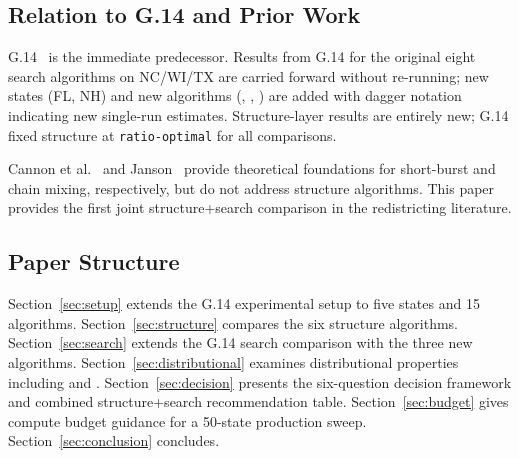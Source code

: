\subsection{Relation to G.14 and Prior Work}

G.14~\citep{dellaLibera2026g14} is the immediate predecessor.
Results from G.14 for the original eight search algorithms on NC/WI/TX are
carried forward without re-running; new states (FL, NH) and new algorithms
(\pt{}, \smcp{}, \ams{}) are added with dagger notation indicating new
single-run estimates.
Structure-layer results are entirely new; G.14 fixed structure at
\texttt{ratio-optimal} for all comparisons.

Cannon et al.~\citep{cannon2022} and Janson~\citep{janson2022} provide
theoretical foundations for short-burst and chain mixing, respectively, but
do not address structure algorithms.
This paper provides the first joint structure+search comparison in the
redistricting literature.

\subsection{Paper Structure}

Section~\ref{sec:setup} extends the G.14 experimental setup to five states
and 15 algorithms.
Section~\ref{sec:structure} compares the six structure algorithms.
Section~\ref{sec:search} extends the G.14 search comparison with the three
new algorithms.
Section~\ref{sec:distributional} examines distributional properties including
\pt{} and \ams{}.
Section~\ref{sec:decision} presents the six-question decision framework and
combined structure+search recommendation table.
Section~\ref{sec:budget} gives compute budget guidance for a 50-state
production sweep.
Section~\ref{sec:conclusion} concludes.
